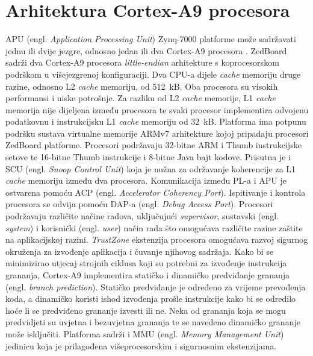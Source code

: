 \documentclass[times, utf8, diplomski, numeric]{fer}
\begin{document}
\chapter{Arhitektura Cortex-A9 procesora}
APU (engl. \textit{Application Processing Unit}) Zynq-7000 platforme može sadržavati jednu ili dvije jezgre, odnosno jedan
ili dva Cortex-A9 procesora \cite{zynq_trm}. ZedBoard sadrži dva Cortex-A9 procesora \textit{little-endian} arhitekture s
koprocesorskom podrškom u višejezgrenoj konfiguraciji. Dva CPU-a dijele \textit{cache} memoriju druge razine,
odnosno L2 \textit{cache} memoriju, od 512~kB.
Oba procesora su visokih performansi i niske potrošnje. Za razliku od L2 \textit{cache} memorije, L1 \textit{cache}
memorija nije dijeljena između procesora te svaki procesor implementira odvojenu podatkovnu i instrukcijsku
L1 \textit{cache} memoriju od 32~kB. Platforma ima potpunu podršku sustava virtualne memorije ARMv7 arhitekture kojoj
pripadaju procesori ZedBoard platforme. Procesori podržavaju 32-bitne ARM i Thumb instrukcijske setove te 16-bitne
Thumb instrukcije i 8-bitne Java bajt kodove. Prisutna je i SCU (engl. \textit{Snoop Control Unit}) koja je nužna za održavanje
koherencije za L1 \textit{cache} memoriju između dva procesora. Komunikacija između PL-a i APU je ostvarena
pomoću ACP (engl. \textit{Accelerator Coherency Port}). Ispitivanje i kontrola procesora se odvija pomoću DAP-a
(engl. \textit{Debug Access Port}). Procesori podržavaju različite načine radova, uključujući \textit{supervisor},
sustavski (engl. \textit{system}) i korisnički (engl. \textit{user}) način rada što omogućava različite razine
zaštite na aplikacijskoj razini. \textit{TrustZone} ekstenzija procesora omogućava razvoj sigurnog okruženja za
izvođenje aplikacija i čuvanje njihovog sadržaja. Kako bi se minimizirao utjecaj strojnih ciklusa koji su potrebni
za izvođenje instrukcija grananja, Cortex-A9 implementira statičko i dinamičko predviđanje grananja (engl.
\textit{branch prediction}). Statičko predviđanje je određeno za vrijeme prevođenja koda, a dinamičko koristi
ishod izvođenja prošle instrukcije kako bi se odredilo hoće li se predviđeno grananje izvesti ili ne. Neka od
grananja koja se mogu predvidjeti su uvjetna i bezuvjetna grananja te se navedeno dinamičko grananje može isključiti.
Platforma sadrži i MMU (engl. \textit{Memory Management Unit}) jedinicu koja je prilagođena višeprocesorskim i sigurnosnim
ekstenzijama.
\end{document}
